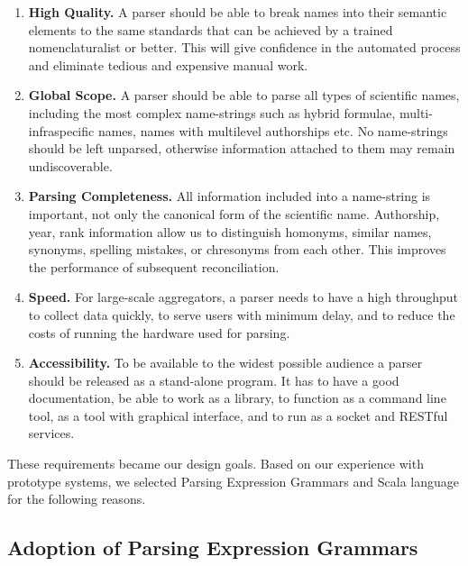 \documentclass{bmcart}
\begin{document}
\begin{enumerate}

  \item \textbf{High Quality.} A parser should be able to break names into
    their semantic elements to the same standards that can be achieved by a
    trained nomenclaturalist or better. This will give confidence in the
    automated process and eliminate tedious and expensive manual work.

  \item \textbf{Global Scope.} A parser should be able to parse all types of
    scientific names, including the most complex name-strings such as hybrid
    formulae, multi-infraspecific names, names with multilevel authorships etc.
    No name-strings should be left unparsed, otherwise information attached to
    them may remain undiscoverable.

  \item \textbf{Parsing Completeness.} All information included into a
    name-string is important, not only the canonical form of the scientific
    name. Authorship, year, rank information allow us to distinguish homonyms,
    similar names, synonyms, spelling mistakes, or chresonyms from each other.
    This improves the performance of subsequent reconciliation.

  \item \textbf{Speed.} For large-scale aggregators, a parser needs to have a
    high throughput to collect data quickly, to serve users with minimum delay,
    and to reduce the costs of running the hardware used for parsing.

  \item \textbf{Accessibility.} To be available to the widest possible audience
    a parser should be released as a stand-alone program. It has to have a
    good documentation, be able to work as a library, to function as a command
    line tool, as a tool with graphical interface, and to run as a socket and
    RESTful services.

\end{enumerate}

These requirements became our design goals. Based on our experience with
prototype systems, we selected Parsing Expression Grammars and Scala language
for the following reasons.

\subsection*{Adoption of Parsing Expression Grammars}
\end{document}
